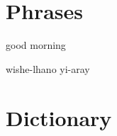 \documentclass[letterpaper,twocolumn,openany,nodeprecatedcode,hidelinks]{dndbook}
\begin{document}
\newpage







% 

% 

% 

% 

% 


\newpage

\section{Phrases}
good morning

wishe-lhano yi-aray




\newpage
\section{Dictionary}

\end{document}
